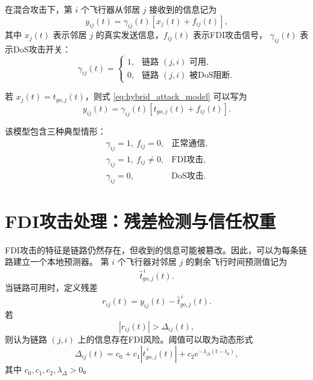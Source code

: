 \documentclass[UTF8,a4paper,11pt]{ctexart}
\begin{document}
在混合攻击下，第 $i$ 个飞行器从邻居 $j$ 接收到的信息记为
\begin{equation}
y_{ij}(t)
=
\gamma_{ij}(t)
\left[
x_j(t)+f_{ij}(t)
\right],
\label{eq:hybrid_attack_model}
\end{equation}
其中 $x_j(t)$ 表示邻居 $j$ 的真实发送信息，$f_{ij}(t)$ 表示FDI攻击信号，
$\gamma_{ij}(t)$ 表示DoS攻击开关：
\begin{equation}
\gamma_{ij}(t)=
\begin{cases}
1, & \text{链路 }(j,i)\text{ 可用},\\
0, & \text{链路 }(j,i)\text{ 被DoS阻断}.
\end{cases}
\label{eq:dos_switch}
\end{equation}

若 $x_j(t)=t_{go,j}(t)$，则式 \eqref{eq:hybrid_attack_model} 可以写为
\begin{equation}
y_{ij}(t)=
\gamma_{ij}(t)
\left[
t_{go,j}(t)+f_{ij}(t)
\right].
\label{eq:tgo_attack_model}
\end{equation}

该模型包含三种典型情形：
\[
\begin{array}{lll}
\gamma_{ij}=1,\ f_{ij}=0, & \text{正常通信},\\
\gamma_{ij}=1,\ f_{ij}\neq 0, & \text{FDI攻击},\\
\gamma_{ij}=0, & \text{DoS攻击}.
\end{array}
\]

\section{FDI攻击处理：残差检测与信任权重}

FDI攻击的特征是链路仍然存在，但收到的信息可能被篡改。因此，可以为每条链路建立一个本地预测器。
第 $i$ 个飞行器对邻居 $j$ 的剩余飞行时间预测值记为
\[
\hat t_{go,j}^{\,i}(t).
\]
当链路可用时，定义残差
\begin{equation}
r_{ij}(t)=
y_{ij}(t)-\hat t_{go,j}^{\,i}(t).
\label{eq:residual}
\end{equation}
若
\begin{equation}
|r_{ij}(t)|>\Delta_{ij}(t),
\label{eq:fdi_detector}
\end{equation}
则认为链路 $(j,i)$ 上的信息存在FDI风险。阈值可以取为动态形式
\begin{equation}
\Delta_{ij}(t)
=
c_0+c_1|\hat t_{go,j}^{\,i}(t)|+c_2 e^{-\lambda_\Delta(t-t_0)},
\label{eq:threshold}
\end{equation}
其中 $c_0,c_1,c_2,\lambda_\Delta>0$。
\end{document}
